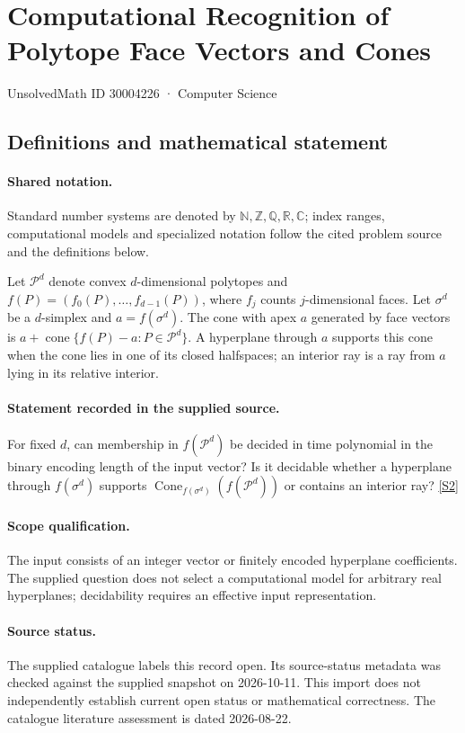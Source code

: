 \documentclass[11pt]{article}
\newcommand{\sref}[2]{\hyperlink{source:#1:#2}{[S#2]}}
\begin{document}
\setcounter{section}{30004225}
\section{Computational Recognition of Polytope Face Vectors and Cones}\label{30004226}
{\small\sffamily UnsolvedMath ID 30004226 · Computer Science}
\subsection{Definitions and mathematical statement}

\paragraph{Shared notation.}Standard number systems are denoted by $\mathbb N,\mathbb Z,\mathbb Q,\mathbb R,\mathbb C$; index ranges, computational models and specialized notation follow the cited problem source and the definitions below.


Let $\mathcal P^d$ denote convex $d$-dimensional polytopes and $f(P)=(f_0(P),\ldots,f_{d-1}(P))$, where $f_j$ counts $j$-dimensional faces. Let $\sigma^d$ be a $d$-simplex and $a=f(\sigma^d)$. The cone with apex $a$ generated by face vectors is $a+\operatorname{cone}\{f(P)-a:P\in\mathcal P^d\}$. A hyperplane through $a$ supports this cone when the cone lies in one of its closed halfspaces; an interior ray is a ray from $a$ lying in its relative interior.
\paragraph{Statement recorded in the supplied source.}
For fixed $d$, can membership in $f(\mathcal P^d)$ be decided in time polynomial in the binary encoding length of the input vector? Is it decidable whether a hyperplane through $f(\sigma^d)$ supports $\operatorname{Cone}_{f(\sigma^d)}(f(\mathcal P^d))$ or contains an interior ray? \sref{30004226}{2}
\paragraph{Scope qualification.}
The input consists of an integer vector or finitely encoded hyperplane coefficients. The supplied question does not select a computational model for arbitrary real hyperplanes; decidability requires an effective input representation.
\paragraph{Source status.}
The supplied catalogue labels this record open. Its source-status metadata was checked against the supplied snapshot on 2026-10-11. This import does not independently establish current open status or mathematical correctness. The catalogue literature assessment is dated 2026-08-22.
\end{document}
